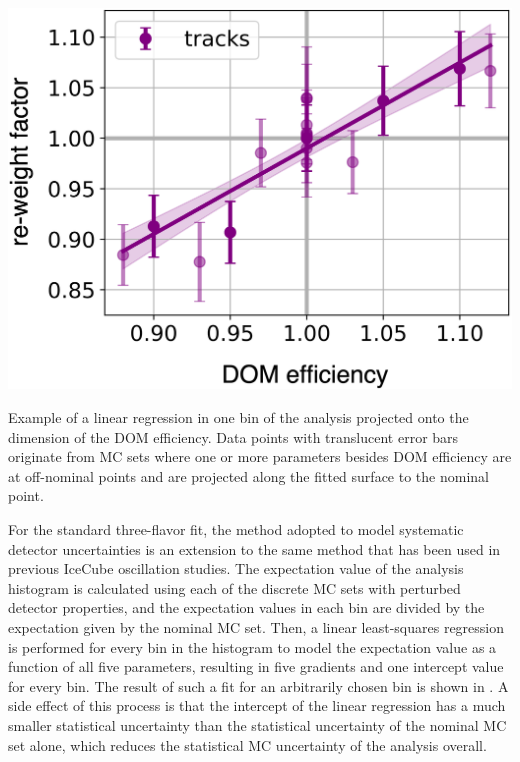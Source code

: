 \begin{marginfigure}[\baselineskip]
    \includegraphics[width=\linewidth]{figures/measurement/systematics/detector/hypersurface_example_v2.png}
    \caption{Example of a linear regression in one bin of the analysis projected onto the dimension of the DOM efficiency. Data points with translucent error bars originate from MC sets where one or more parameters besides DOM efficiency are at off-nominal points and are projected along the fitted surface to the nominal point.}
\end{marginfigure}
For the standard three-flavor fit, the method adopted to model systematic detector uncertainties is an extension to the same method that has been used in previous IceCube oscillation studies\cite{IceCube:2019dqi}.
The expectation value of the analysis histogram is calculated using each of the discrete MC sets with perturbed detector properties, and the expectation values in each bin are divided by the expectation given by the nominal MC set.
Then, a linear least-squares regression is performed for every bin in the histogram to model the expectation value as a function of all five parameters, resulting in five gradients and one intercept value for every bin.
The result of such a fit for an arbitrarily chosen bin is shown in .
A side effect of this process is that the intercept of the linear regression has a much smaller statistical uncertainty than the statistical uncertainty of the nominal MC set alone, which reduces the statistical MC uncertainty of the analysis overall.

